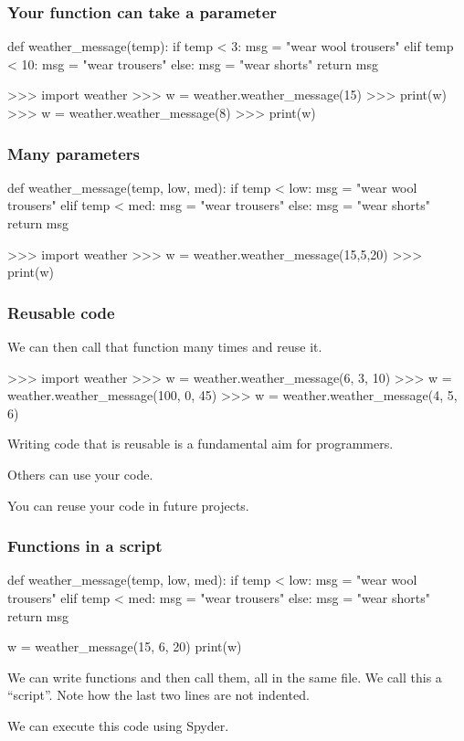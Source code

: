 \documentclass{beamer}
\begin{document}
\begin{frame}[fragile]
\frametitle{Your function can take a parameter}
\begin{shaded}
\begin{code}
def weather_message(temp):
   if temp < 3:
      msg = "wear wool trousers"
   elif temp < 10:
      msg = "wear trousers"
   else: 
      msg = "wear shorts"
   return msg
\end{code}
\end{shaded}
\begin{code}
>>> import weather
>>> w = weather.weather_message(15)
>>> print(w)
>>> w = weather.weather_message(8)
>>> print(w)
\end{code}
\end{frame}

\begin{frame}[fragile]
\frametitle{Many parameters}
\begin{shaded}
\begin{code}
def weather_message(temp, low, med):
   if temp < low:
      msg = "wear wool trousers"
   elif temp < med:
      msg = "wear trousers"
   else: 
      msg = "wear shorts"
   return msg
\end{code}
\end{shaded}
\begin{code}
>>> import weather
>>> w = weather.weather_message(15,5,20)
>>> print(w)
\end{code}
\end{frame}

\begin{frame}[fragile]
\frametitle{Reusable code}
We can then call that function many times and reuse it.
\begin{code}
>>> import weather
>>> w = weather.weather_message(6, 3, 10)
>>> w = weather.weather_message(100, 0, 45)
>>> w = weather.weather_message(4, 5, 6)
\end{code}
Writing code that is reusable is a fundamental aim for
programmers.

\bigskip

Others can use your code.

\bigskip

You can reuse your code in future projects.
\end{frame}

\begin{frame}[fragile]
\frametitle{Functions in a script}
\begin{shaded}
\begin{code}
def weather_message(temp, low, med):
   if temp < low:
      msg = "wear wool trousers"
   elif temp < med:
      msg = "wear trousers"
   else:
      msg = "wear shorts"
   return msg

w = weather_message(15, 6, 20)
print(w)
\end{code}
\end{shaded}
We can write functions and then call them, all in the
same file. We call this a ``script''. Note how the last two lines are
not indented.

\bigskip

We can execute this code using Spyder.
\end{frame}
\end{document}
